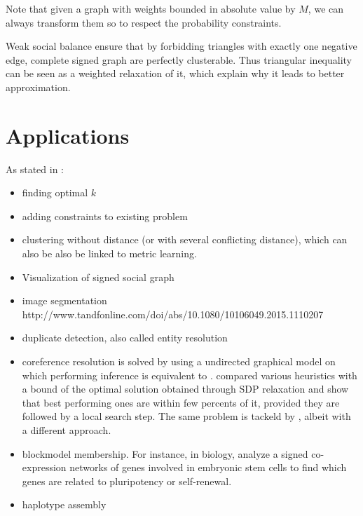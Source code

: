 Note that given a graph with weights bounded in absolute value by $M$, we can
always transform them so to respect the probability constraints.

Weak social balance ensure that by forbidding triangles with exactly one
negative edge, complete signed graph are perfectly
clusterable\autocite{davis1967clustering}. Thus triangular inequality can be
seen as a weighted relaxation of it, which explain why it leads to better
approximation.

\section{Applications}
\label{sec:appli}
As stated in \autocite[Section 5]{Demaine2006}:
\begin{itemize}
	\item finding optimal $k$
	\item adding constraints to existing problem
	\item clustering without distance (or with several conflicting
		distance), which can also be also be linked to metric learning.
	\item Visualization of signed social graph \autocite{Luca10}
	\item image segmentation \autocites{Bagon2011}{Kim2011}
http://www.tandfonline.com/doi/abs/10.1080/10106049.2015.1110207
	\item duplicate detection, also called entity resolution \autocite{DeDup09}
	\item coreference resolution is solved by \textcite[Section
		2.3]{graphicalCoreference04} using a undirected graphical model on
		which performing inference is equivalent to \pcc{}.
		\Textcite{Elsner2009} compared various heuristics with a bound of the
		optimal solution obtained through SDP relaxation and show that best
		performing ones are within few percents of it, provided they are
		followed by a local search step. The same problem is tackeld
		by \textcite{Chatel14}, albeit with a different approach.
	\item blockmodel membership. For instance, in biology,
		\textcite{Mason2009} analyze a signed co-expression networks of genes
		involved in embryonic stem cells to find which genes are related to
		pluripotency or self-renewal.
	\item haplotype assembly \autocite{Das2015}
\end{itemize}


